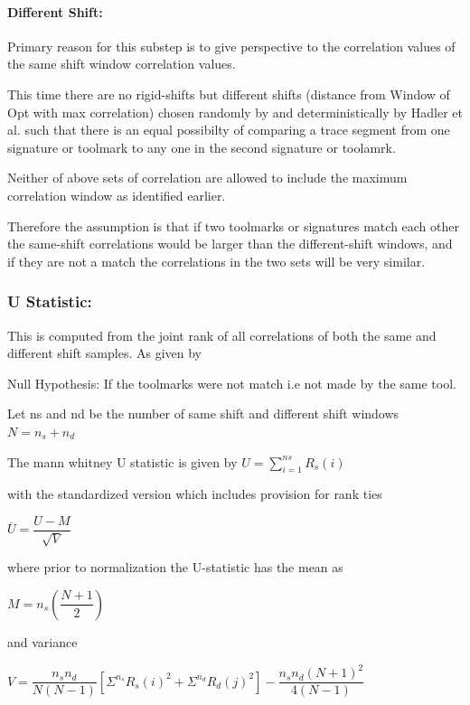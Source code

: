 \documentclass[12pt]{article}
\begin{document}
\paragraph{Different Shift:}\label{different-shift}

Primary reason for this substep is to give perspective to the
correlation values of the same shift window correlation values.

This time there are no rigid-shifts but different shifts (distance from
Window of Opt with max correlation) chosen randomly by \citet{chumbley}
and deterministically by Hadler et al. such that there is an equal
possibilty of comparing a trace segment from one signature or toolmark
to any one in the second signature or toolamrk.

Neither of above sets of correlation are allowed to include the maximum
correlation window as identified earlier.

Therefore the assumption is that if two toolmarks or signatures match
each other the same-shift correlations would be larger than the
different-shift windows, and if they are not a match the correlations in
the two sets will be very similar.

\subsubsection{U Statistic:}\label{u-statistic}

This is computed from the joint rank of all correlations of both the
same and different shift samples. As given by \citet{hadler}

Null Hypothesis: If the toolmarks were not match i.e not made by the
same tool.

Let ns and nd be the number of same shift and different shift windows
\(N = n_{s} + n_{d}\)

The mann whitney U statistic is given by
\(U =\sum^{ns}_{i=1}R_{s}\left( i\right)\)

with the standardized version which includes provision for rank ties

\(\overline{U}= \dfrac{U-M}{\sqrt{V}}\)

where prior to normalization the U-statistic has the mean as

\(M = n_{s}\left(\dfrac{N+1}{2}\right)\)

and variance

\(V = \dfrac{n_{s}n_{d}}{N\left(N-1\right)}\left[\Sigma^{n_{s}}R_{s}\left(i\right)^{2}+\Sigma^{n_{d}}R_{d}\left(j\right)^{2}\right] -\dfrac{n_{s} n_{d}\left(N+1\right)^{2}}{4\left(N-1\right)}\)
\end{document}
